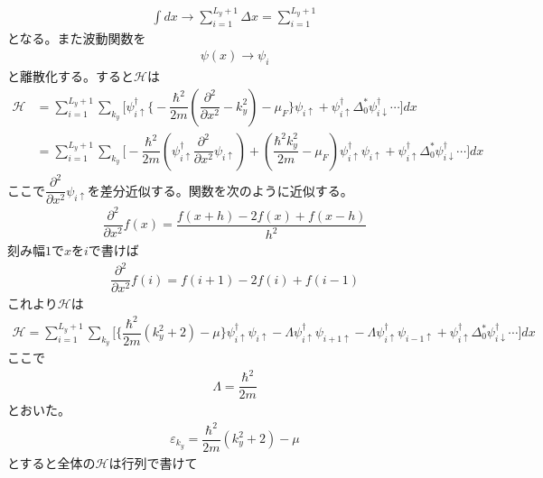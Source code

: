 \documentclass{jarticle}
\begin{document}
\begin{align}
\int dx\rightarrow\sum_{i=1}^{L_y+1}\Delta x=\sum_{i=1}^{L_y+1}
\end{align}
となる。また波動関数を
\begin{align}
\psi(x)\rightarrow\psi_i
\end{align}
と離散化する。すると$\mathcal{H}$は
\begin{align}
\mathcal{H}&=\sum_{i=1}^{L_y+1}\displaystyle\sum_{k_y}\Big[\psi_{i\uparrow}^{\dagger}\big\{-\dfrac{\hbar^2}{2m}(\dfrac{\partial^{2}}{\partial x^2}-k^{2}_y)-\mu_F\big\}\psi_{i\uparrow}+\psi_{i\uparrow}^{\dagger}\Delta^{*}_0\psi_{i\downarrow}^{\dagger}\cdots\Big]dx\\
&=\sum_{i=1}^{L_y+1}\displaystyle\sum_{k_y}\Big[-\dfrac{\hbar^2}{2m}(\psi_{i\uparrow}^{\dagger}\dfrac{\partial^{2}}{\partial x^2}\psi_{i\uparrow})+(\dfrac{\hbar^2k^{2}_y}{2m}-\mu_F)\psi_{i\uparrow}^{\dagger}\psi_{i\uparrow}+\psi_{i\uparrow}^{\dagger}\Delta^{*}_0\psi_{i\downarrow}^{\dagger}\cdots\Big]dx
\end{align}
ここで$\dfrac{\partial^{2}}{\partial x^2}\psi_{i\uparrow}$を差分近似する。関数を次のように近似する。
\begin{align}
\dfrac{\partial^{2}}{\partial x^2}f(x)=\dfrac{f(x+h)-2f(x)+f(x-h)}{h^2}
\end{align}
刻み幅$1$で$x$を$i$で書けば
\begin{align}
\dfrac{\partial^{2}}{\partial x^2}f(i)=f(i+1)-2f(i)+f(i-1)
\end{align}
これより$\mathcal{H}$は
\begin{align}
\mathcal{H}
=\sum_{i=1}^{L_y+1}\displaystyle\sum_{k_y}\Big[\big\{\dfrac{\hbar^2}{2m}(k_y^2+2)-\mu\big\}\psi_{i\uparrow}^{\dagger}\psi_{i\uparrow}-\Lambda\psi_{i\uparrow}^{\dagger}\psi_{i+1\uparrow}-\Lambda\psi_{i\uparrow}^{\dagger}\psi_{i-1\uparrow}+\psi_{i\uparrow}^{\dagger}\Delta^{*}_0\psi_{i\downarrow}^{\dagger}\cdots\Big]dx
\end{align}
ここで
\begin{align}
\Lambda=\dfrac{\hbar^2}{2m}
\end{align}
とおいた。
\begin{align}
\varepsilon_{k_y}=\dfrac{\hbar^2}{2m}(k_y^2+2)-\mu
\end{align}
とすると全体の$\mathcal{H}$は行列で書けて
\end{document}
